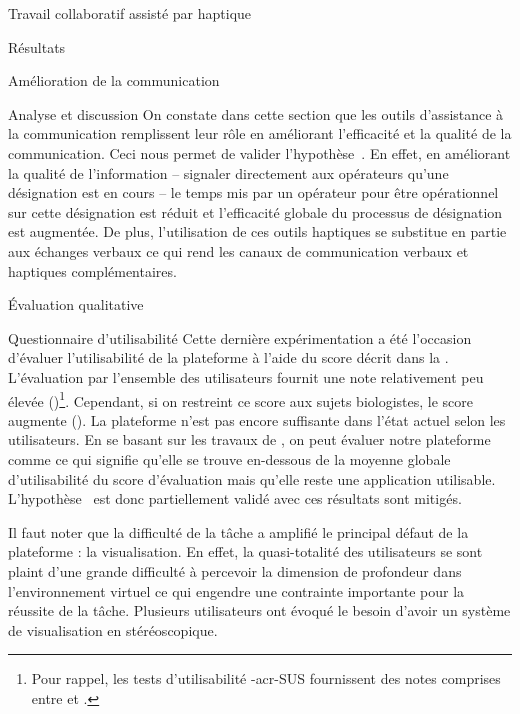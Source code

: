 \documentclass[myfrancais,ngerman,english,french]{mythesis}
\begin{document}
\begin{mychapter}{Travail collaboratif assisté par haptique}
\begin{mysection}{Résultats}
\begin{mysubsection}{Amélioration de la communication}
\begin{mysubsubsection}{Analyse et discussion}
					On constate dans cette section que les outils d'assistance à la communication remplissent leur rôle en améliorant l'efficacité et la qualité de la communication.
					Ceci nous permet de valider l'hypothèse~.
					En effet, en améliorant la qualité de l'information -- signaler directement aux opérateurs qu'une désignation est en cours -- le temps mis par un opérateur pour être opérationnel sur cette désignation est réduit et l'efficacité globale du processus de désignation est augmentée.
					De plus, l'utilisation de ces outils haptiques se substitue en partie aux échanges verbaux ce qui rend les canaux de communication verbaux et haptiques complémentaires.
				\end{mysubsubsection}
			\end{mysubsection}
			\begin{mysubsection}{Évaluation qualitative}
				\begin{mysubsubsection}{Questionnaire d'utilisabilité}
					Cette dernière expérimentation a été l'occasion d'évaluer l'utilisabilité de la plateforme \myShaddock à l'aide du score  décrit dans la .
					L'évaluation par l'ensemble des utilisateurs fournit une note relativement peu élevée ()\footnote{Pour rappel, les tests d'utilisabilité \myacronl-{acr-SUS} fournissent des notes comprises entre  et .}.
					Cependant, si on restreint ce score aux sujets biologistes, le score augmente ().
					La plateforme n'est pas encore suffisante dans l'état actuel selon les utilisateurs.
					En se basant sur les travaux de , on peut évaluer notre plateforme comme \og {} \fg ce qui signifie qu'elle se trouve en-dessous de la moyenne globale d'utilisabilité du score d'évaluation  mais qu'elle reste une application utilisable.
					L'hypothèse~ est donc partiellement validé avec ces résultats sont mitigés.

					Il faut noter que la difficulté de la tâche a amplifié le principal défaut de la plateforme : la visualisation.
					En effet, la quasi-totalité des utilisateurs se sont plaint d'une grande difficulté à percevoir la dimension de profondeur dans l'environnement virtuel ce qui engendre une contrainte importante pour la réussite de la tâche.
					Plusieurs utilisateurs ont évoqué le besoin d'avoir un système de visualisation en \myThreeD stéréoscopique.


\end{mysubsubsection}
\end{mysubsection}
\end{mysection}
\end{mychapter}
\end{document}
